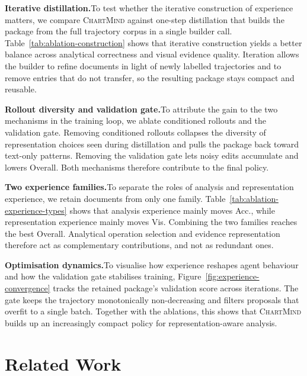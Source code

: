 \documentclass{article}
\newcommand{\method}{\textsc{ChartMind}\xspace}
\newcommand{\stitle}[1]{\noindent\textbf{#1}}
\begin{document}
\stitle{Iterative distillation.}\quad To test whether the iterative construction of experience matters, we compare \method{} against one-step distillation that builds the package from the full trajectory corpus in a single builder call. Table~\ref{tab:ablation-construction} shows that iterative construction yields a better balance across analytical correctness and visual evidence quality. Iteration allows the builder to refine documents in light of newly labelled trajectories and to remove entries that do not transfer, so the resulting package stays compact and reusable.

\stitle{Rollout diversity and validation gate.}\quad To attribute the gain to the two mechanisms in the training loop, we ablate conditioned rollouts and the validation gate. Removing conditioned rollouts collapses the diversity of representation choices seen during distillation and pulls the package back toward text-only patterns. Removing the validation gate lets noisy edits accumulate and lowers Overall. Both mechanisms therefore contribute to the final policy.

\stitle{Two experience families.}\quad To separate the roles of analysis and representation experience, we retain documents from only one family. Table~\ref{tab:ablation-experience-types} shows that analysis experience mainly moves Acc., while representation experience mainly moves Vis. Combining the two families reaches the best Overall. Analytical operation selection and evidence representation therefore act as complementary contributions, and not as redundant ones.

\stitle{Optimisation dynamics.}\quad To visualise how experience reshapes agent behaviour and how the validation gate stabilises training, Figure~\ref{fig:experience-convergence} tracks the retained package's validation score across iterations. The gate keeps the trajectory monotonically non-decreasing and filters proposals that overfit to a single batch. Together with the ablations, this shows that \method{} builds up an increasingly compact policy for representation-aware analysis.

\FloatBarrier
\section{Related Work}
\label{sec:related}
\end{document}
